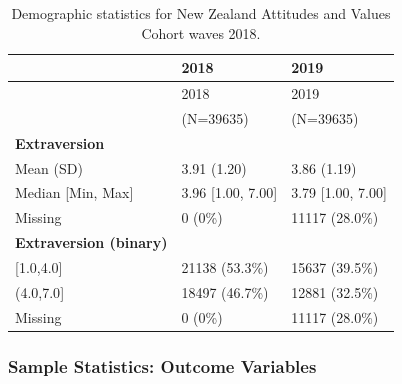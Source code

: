 \documentclass[
  single column]{article}
\begin{document}
\begin{longtable}[]{@{}lll@{}}
\caption{Demographic statistics for New Zealand Attitudes and Values
Cohort waves 2018.}\label{tbl-appendix-exposures}\tabularnewline
\toprule\noalign{}
& 2018 & 2019 \\
\midrule\noalign{}
\endfirsthead
\toprule\noalign{}
& 2018 & 2019 \\
\midrule\noalign{}
\endhead
\bottomrule\noalign{}
\endlastfoot
& (N=39635) & (N=39635) \\
\textbf{Extraversion} & & \\
Mean (SD) & 3.91 (1.20) & 3.86 (1.19) \\
Median {[}Min, Max{]} & 3.96 {[}1.00, 7.00{]} & 3.79 {[}1.00, 7.00{]} \\
Missing & 0 (0\%) & 11117 (28.0\%) \\
\textbf{Extraversion (binary)} & & \\
{[}1.0,4.0{]} & 21138 (53.3\%) & 15637 (39.5\%) \\
(4.0,7.0{]} & 18497 (46.7\%) & 12881 (32.5\%) \\
Missing & 0 (0\%) & 11117 (28.0\%) \\
\end{longtable}

\newpage{}

\subsubsection{Sample Statistics: Outcome
Variables}\label{appendix-outcomes}
\end{document}
